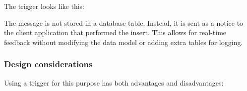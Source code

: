 The trigger looks like this:

\begin{Shaded}
\begin{Highlighting}[]
   
\NormalTok{ $$}
\NormalTok{, }
 \NormalTok{;}
\NormalTok{;}
\NormalTok{$$;}

   

 
      
      
     
\end{Highlighting}
\end{Shaded}

The message is not stored in a database table. Instead, it is sent as a
notice to the client application that performed the insert. This allows
for real-time feedback without modifying the data model or adding extra
tables for logging.

\hypertarget{design-considerations}{%
\subsubsection{Design considerations}\label{design-considerations}}

Using a trigger for this purpose has both advantages and disadvantages:

